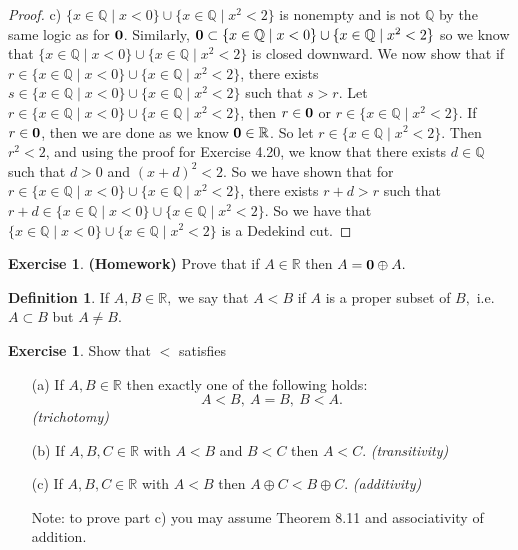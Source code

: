 \documentclass[12pt]{article}
\newcommand{\bbQ}{\mathbb{Q}}
\newcommand{\bbR}{\mathbb{R}}
\renewcommand{\_}[1]{\underline{ #1 }}
\theoremstyle{definition}
\newtheorem{definition}[theorem]{Definition}
\newtheorem{exercise}[theorem]{Exercise}
\numberwithin{equation}{subsection}
\begin{document}
\begin{proof}
c) $\{x\in\bbQ\mid x<0\}\cup\{x\in\bbQ\mid x^2<2\}$ is nonempty and is not $\bbQ$ by the same logic as for ${\bf 0}$. Similarly, ${\bf 0} \subset \{x\in\bbQ\mid x<0\}\cup\{x\in\bbQ\mid x^2<2\}$ so we know that $\{x\in\bbQ\mid x<0\}\cup\{x\in\bbQ\mid x^2<2\}$ is closed downward. \newline
We now show that if $r \in \{x\in\bbQ\mid x<0\}\cup\{x\in\bbQ\mid x^2<2\}$, there exists $s \in \{x\in\bbQ\mid x<0\}\cup\{x\in\bbQ\mid x^2<2\}$ such that $s > r$. \newline
Let $r \in \{x\in\bbQ\mid x<0\}\cup\{x\in\bbQ\mid x^2<2\}$, then $r \in {\bf 0}$ or $r \in \{x \in \bbQ \mid x^2 < 2\}$. If $r \in {\bf 0}$, then we are done as we know ${\bf 0} \in \bbR$. \newline
So let $r \in \{x \in \bbQ \mid x^2 < 2\}$. Then $r^2 < 2$, and using the proof for Exercise 4.20, we know that there exists $d \in \bbQ$ such that $d > 0$ and $(x + d)^2 < 2$. So we have shown that for $r \in \{x\in\bbQ\mid x<0\}\cup\{x\in\bbQ\mid x^2<2\}$, there exists $r + d > r$ such that $r + d \in \{x\in\bbQ\mid x<0\}\cup\{x\in\bbQ\mid x^2<2\}$. \newline
So we have that $\{x\in\bbQ\mid x<0\}\cup\{x\in\bbQ\mid x^2<2\}$ is a Dedekind cut.
\end{proof}

\begin{exercise} {\bf (Homework)}
Prove that if $A\in \bbR$ then $A={\bf 0}\oplus A.$
\end{exercise}

\begin{definition}
If $A,B\in \bbR,$ we say that $A<B$ if $A$ is a proper subset of $B,$ i.e. $A\subset B$ but $A\neq B.$ 
\end{definition}

\begin{exercise}
Show that $<$ satisfies
\begin{itemize}
\item[(a)] If $A,B\in \bbR$ then exactly one of the following holds:
$$A<B,\ A=B,\  B<A.$$ {\it (trichotomy)}
\item[(b)] If $A,B,C\in \bbR$ with $A<B$ and $B<C$ then $A<C.$ {\it (transitivity)}
\item[(c)] If $A,B,C\in\bbR$ with $A<B$ then $A\oplus C<B\oplus C.$ {\it (additivity)}

Note: to prove part c) you may assume Theorem 8.11 and associativity of addition.
\end{itemize}
\end{exercise}
\end{document}
